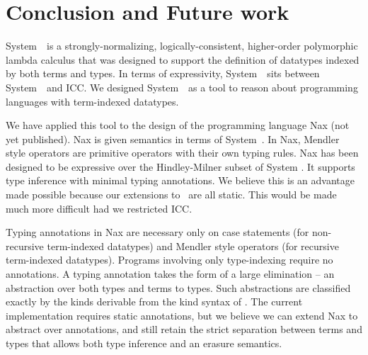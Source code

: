 \section{Conclusion and Future work}
\label{sec:concl}

System~\Fi\ is a strongly-normalizing, logically-consistent, higher-order
polymorphic lambda calculus that was designed to support the
definition of datatypes indexed by both terms and types.
In terms of expressivity, System~\Fi\ sits between System~\Fw\ and ICC.
We designed System~\Fi\ as a tool to reason about programming
languages with term-indexed datatypes. 

We have applied this tool to the design of the programming language Nax (not yet published).
Nax is given semantics in terms of System~\Fi . In Nax, Mendler style operators
are primitive operators with their own typing rules. Nax has been designed to
be expressive over the Hindley-Milner subset of System \Fi. It supports type
inference with minimal typing annotations. We believe this is an advantage
made possible because our extensions to \Fw\ are all static. This would be made
much more difficult had we restricted ICC.

Typing annotations in Nax are necessary only
on case statements (for non-recursive term-indexed datatypes)
and Mendler style operators (for recursive term-indexed datatypes).
Programs involving only type-indexing require no annotations.
A typing annotation takes the form of a large elimination --
an abstraction over both types and terms to types. Such abstractions
are classified exactly by the kinds derivable from the kind
syntax of \Fi.   The current implementation requires
static annotations, but we believe we can extend Nax to abstract over
annotations, and still retain the strict separation between terms and types
that allows both type inference and an erasure semantics.
 
